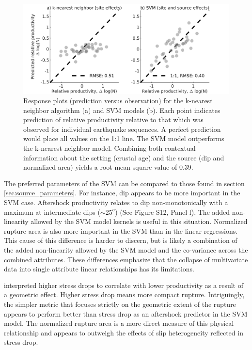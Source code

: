 \documentclass[draft]{agujournal2018}
\begin{document}
    \begin{figure}
        \centering
        \includegraphics{figures/response.png}
        \caption{Response plots (prediction versus observation) for the k-nearest neighbor algorithm (a) and SVM models (b). Each point indicates prediction of relative productivity relative to that which was observed for individual earthquake sequences. A perfect prediction would place all values on the 1:1 line. The SVM model outperforms the k-nearest neighbor model. Combining both contextual information about the setting (crustal age) and the source (dip and normalized area) yields a root mean square value of 0.39.}
        \label{fig:response}
    \end{figure}
    
The preferred parameters of the SVM can be compared to those found in section \ref{sec:source_parameters}. For instance, dip appears to be more important in the SVM case. Aftershock productivity relates to dip non-monotonically with a maximum at intermediate  dips ($\sim 25^o$) (See Figure S12, Panel l). The added non-linearity allowed by the SVM model kernels is useful in this situation. Normalized rupture area is also more important in the SVM than in the linear regressions. This cause of this difference is harder to discern, but is likely a combination of the added non-linearity allowed by the SVM model and the co-variance across the combined attributes. These differences emphasize that the collapse of multivariate data into single attribute linear relationships has its limitations.

 \citet{Wetzler2016} interpreted higher stress drops to correlate with lower productivity as a result of a geometric effect. Higher stress drop means more compact rupture. Intriguingly, the simpler metric that focuses strictly on the geometric extent of the rupture appears to perform better than stress drop as an aftershock predictor in the SVM model. The normalized rupture area is a more direct measure of this physical relationship and appears to outweigh the effects of slip heterogeneity reflected in stress drop.
\end{document}
